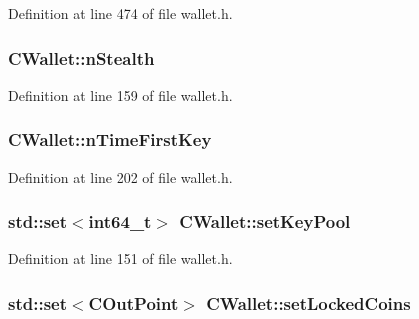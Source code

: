 Definition at line 474 of file wallet.\+h.

\hypertarget{class_c_wallet_a9d26635575a63731798ac70047dd9b43}{}
\subsubsection[{n\+Stealth}]{ C\+Wallet\+::n\+Stealth}\label{class_c_wallet_a9d26635575a63731798ac70047dd9b43}


Definition at line 159 of file wallet.\+h.

\hypertarget{class_c_wallet_a817c0d1034377a7bd70a714140a5a8ca}{}
\subsubsection[{n\+Time\+First\+Key}]{ C\+Wallet\+::n\+Time\+First\+Key}\label{class_c_wallet_a817c0d1034377a7bd70a714140a5a8ca}


Definition at line 202 of file wallet.\+h.

\hypertarget{class_c_wallet_a363fabb2b82d596c33e4fa3920a11c26}{}
\subsubsection[{set\+Key\+Pool}]{\setlength{\rightskip}{0pt plus 5cm}std\+::set$<${\bf int64\+\_\+t}$>$ C\+Wallet\+::set\+Key\+Pool}\label{class_c_wallet_a363fabb2b82d596c33e4fa3920a11c26}


Definition at line 151 of file wallet.\+h.

\hypertarget{class_c_wallet_a658aebcd4c617f5a29f5df3d8878c450}{}
\subsubsection[{set\+Locked\+Coins}]{\setlength{\rightskip}{0pt plus 5cm}std\+::set$<${\bf C\+Out\+Point}$>$ C\+Wallet\+::set\+Locked\+Coins}\label{class_c_wallet_a658aebcd4c617f5a29f5df3d8878c450}


